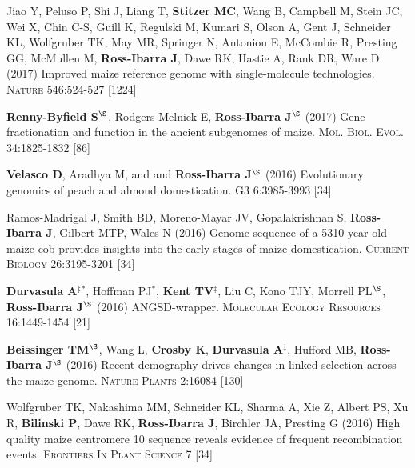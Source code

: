 \documentclass[letterpaper,10pt]{article}
\begin{document}
\begin{etaremune}
\item  Jiao Y, Peluso P,  Shi J,  Liang T, {\bf Stitzer MC}, Wang B,  Campbell M, Stein JC,  Wei X,  Chin C-S,  Guill K,  Regulski M,  Kumari S,  Olson A,  Gent J, Schneider KL,  Wolfgruber TK, May MR, Springer N,  Antoniou E,  McCombie R, Presting GG,  McMullen M, {\bf Ross-Ibarra J}, Dawe RK,  Hastie A, Rank DR, Ware D (2017) Improved maize reference genome with single-molecule technologies. \textsc{Nature}  546:524-527
 [1224]\\

\item  {\bf Renny-Byfield S}$^\S$, Rodgers-Melnick E, {\bf Ross-Ibarra J}$^\S$ (2017) Gene fractionation and function in the ancient subgenomes of maize. \textsc{Mol. Biol. Evol.} 34:1825-1832
 [86]\\

\item {\bf Velasco D}, Aradhya M, and  and {\bf Ross-Ibarra J}$^\S$ (2016) Evolutionary genomics of peach and almond domestication. \textsc{G3} 6:3985-3993
 [34]\\

\item Ramos-Madrigal J, Smith BD, Moreno-Mayar JV, Gopalakrishnan S, {\bf Ross-Ibarra J}, Gilbert MTP, Wales N (2016) Genome sequence of a 5310-year-old maize cob provides insights into the early stages of maize domestication. \textsc{Current Biology} 26:3195-3201
 [34]\\

\item {\bf Durvasula A}$^\ddagger$$^*$,  Hoffman PJ$^*$, {\bf Kent TV}$^\ddagger$, Liu C, Kono TJY, Morrell PL$^\S$, {\bf Ross-Ibarra J}$^\S$ (2016) ANGSD-wrapper. \textsc{Molecular Ecology Resources} 16:1449-1454
 [21]\\

\item {\bf Beissinger TM}$^\S$, Wang L, {\bf Crosby K}, {\bf Durvasula A}$^\ddagger$, Hufford MB, {\bf Ross-Ibarra J}$^\S$ (2016)  Recent demography drives changes in linked selection across the maize genome. \textsc{Nature Plants} 2:16084
 [130]\\

\item Wolfgruber TK, Nakashima MM, Schneider KL, Sharma A, Xie Z, Albert PS, Xu R, {\bf Bilinski P},  Dawe RK, {\bf Ross-Ibarra J}, Birchler JA, Presting G (2016) High quality maize centromere 10 sequence reveals evidence of frequent recombination events. \textsc{Frontiers In Plant Science} 7
 [34]\\


\end{etaremune}
\end{document}
